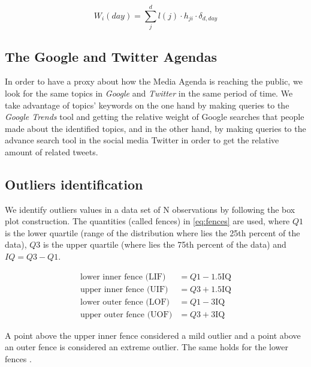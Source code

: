 \documentclass[10pt,letterpaper]{article}
\begin{document}
\begin{equation}
W_i(day) = \sum_j^d l(j) \cdot h_{ji} \cdot \delta_{d,day}
\label{eq:topic_weight}
\end{equation}


\subsection*{The Google and Twitter Agendas}
 
\par In order to have a proxy about how the Media Agenda is reaching the public, we look for the same topics in \emph{Google} and \emph{Twitter} in the same period of time. We take advantage of topics' keywords on the one hand by making queries to the \emph{Google Trends} tool and getting the relative weight of Google searches that people made about the identified topics, and in the other hand, by making queries to the advance search tool in the social media Twitter in order to get the relative amount of related tweets. 


\subsection*{Outliers identification}
\label{sec:outliers_identification}

\par We identify outliers values in a data set of N observations by following the box plot construction. The quantities (called fences) in \ref{eq:fences} are used, where $Q1$ is the lower quartile (range of the distribution where lies the 25th percent of the data), $Q3$ is the upper quartile (where lies the 75th percent of the data) and $IQ = Q3 - Q1$.

\begin{equation}
\begin{split}
\text{lower inner fence (LIF)} & = Q1 - 1.5  \text{IQ} \\
\text{upper inner fence (UIF)} & = Q3 + 1.5  \text{IQ} \\
\text{lower outer fence (LOF)} & = Q1 - 3  \text{IQ} \\
\text{upper outer fence (UOF)} & = Q3 + 3  \text{IQ}
\end{split}
\label{eq:fences}
\end{equation}

\par A point above the upper inner fence considered a mild outlier and a point above an outer fence is considered an extreme outlier. The same holds for the lower fences \cite{natrella2010nist}. 
\end{document}
